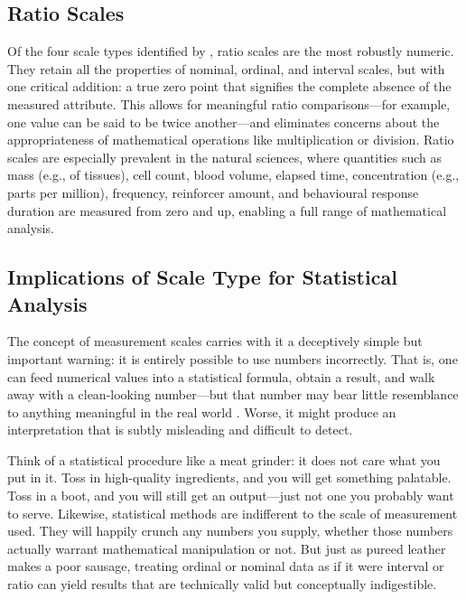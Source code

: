 \subsection{Ratio Scales}
\label{sec:ratio}

Of the four scale types identified by \textcite{Stevens1946}, \glspl{ratio scale} are the most robustly numeric. They retain all the properties of nominal, ordinal, and interval scales, but with one critical addition: a true zero point that signifies the complete absence of the measured attribute. This allows for meaningful ratio comparisons—for example, one value can be said to be twice another—and eliminates concerns about the appropriateness of mathematical operations like multiplication or division. Ratio scales are especially prevalent in the natural sciences, where quantities such as mass (e.g., of tissues), cell count, blood volume, elapsed time, concentration (e.g., parts per million), frequency, reinforcer amount, and behavioural response duration are measured from zero and up, enabling a full range of mathematical analysis.


\subsection{Implications of Scale Type for Statistical Analysis}

The concept of measurement scales carries with it a deceptively simple but important warning: it is entirely possible to use numbers incorrectly. That is, one can feed numerical values into a statistical formula, obtain a result, and walk away with a clean-looking number—but that number may bear little resemblance to anything meaningful in the real world \parencite{Roberts1985}. Worse, it might produce an interpretation that is subtly misleading and difficult to detect.

Think of a statistical procedure like a meat grinder: it does not care what you put in it. Toss in high-quality ingredients, and you will get something palatable. Toss in a boot, and you will still get an output—just not one you probably want to serve. Likewise, statistical methods are indifferent to the scale of measurement used. They will happily crunch any numbers you supply, whether those numbers actually warrant mathematical manipulation or not. But just as pureed leather makes a poor sausage, treating ordinal or nominal data as if it were interval or ratio can yield results that are technically valid but conceptually indigestible.

